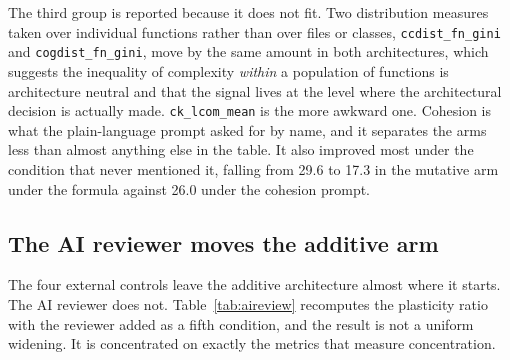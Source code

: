 \documentclass[11pt,a4paper]{article}
\begin{document}
The third group is reported because it does not fit. Two distribution measures
taken over individual functions rather than over files or classes,
\texttt{ccdist\_fn\_gini} and \texttt{cogdist\_fn\_gini}, move by the same
amount in both architectures, which suggests the inequality of complexity
\emph{within} a population of functions is architecture neutral and that the
signal lives at the level where the architectural decision is actually made.
\texttt{ck\_lcom\_mean} is the more awkward one. Cohesion is what the
plain-language prompt asked for by name, and it separates the arms less than
almost anything else in the table. It also improved most under the condition
that never mentioned it, falling from 29.6 to 17.3 in the mutative arm under the
formula against 26.0 under the cohesion prompt.

\subsection{The AI reviewer moves the additive arm}
\label{sec:aireview}

The four external controls leave the additive architecture almost where it
starts. The AI reviewer does not. Table~\ref{tab:aireview} recomputes the
plasticity ratio with the reviewer added as a fifth condition, and the result is
not a uniform widening. It is concentrated on exactly the metrics that measure
concentration.
\end{document}
